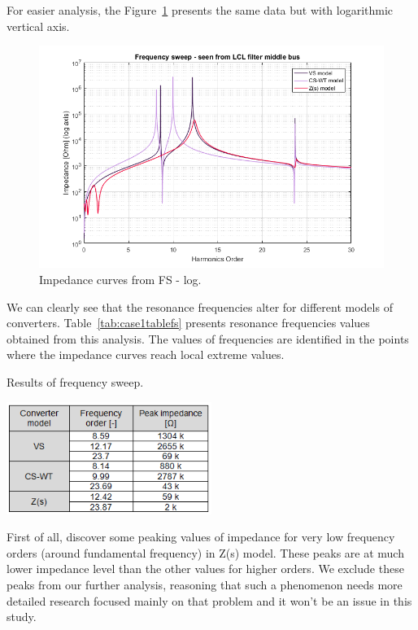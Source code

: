 \documentclass[12pt]{report} %
\begin{document}
For easier analysis, the Figure~\ref{fig:case1fslog} presents the same data but with logarithmic vertical axis.

\begin{figure}[htb]
	\centering
	\includegraphics[width=1\textwidth]{img/Case1/Case1_FS_log.png}
  	\caption{Impedance curves from FS - log.}
  	\label{fig:case1fslog}
\end{figure}
\FloatBarrier

We can clearly see that the resonance frequencies alter for different models of converters. Table~\ref{tab:case1tablefs} presents  resonance frequencies values obtained from this analysis. The values of frequencies are identified in the points where the impedance curves reach local extreme values.

\begin{table}[htb]
	\centering
	\caption{Results of frequency sweep.}
	\includegraphics[width=0.5\textwidth]{img/Case1/table_FS.png}
  	\label{tab:case1tablefs}
\end{table}
\FloatBarrier

First of all, discover some peaking values of impedance for very low frequency orders (around fundamental frequency) in Z(s) model. These peaks are at much lower impedance level than the other values for higher orders. We exclude these peaks from our further analysis, reasoning that such a phenomenon needs more detailed research focused mainly on that problem and it won't be an issue in this study.
\end{document}
